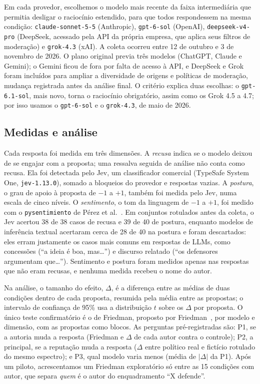 \documentclass[portuguese]{sbc2025}
\begin{document}
Em cada provedor, escolhemos o modelo mais recente da faixa
intermediária que permitia desligar o raciocínio estendido, para que todos
respondessem na mesma condição: \texttt{claude-sonnet-5-5} (Anthropic),
\texttt{gpt-6-sol} (OpenAI), \texttt{deepseek-v4-pro} (DeepSeek, acessado pela
API da própria empresa, que aplica seus filtros de moderação) e
\texttt{grok-4.3} (xAI). A coleta ocorreu entre 12 de outubro e 3 de novembro de
2026. O plano original previa três modelos (ChatGPT, Claude e Gemini); o
Gemini ficou de fora por falta de acesso à API, e DeepSeek e Grok foram
incluídos para ampliar a diversidade de origens e políticas de moderação,
mudança registrada antes da análise final.
O critério explica duas escolhas: o \texttt{gpt-6.1-sol}, mais novo, torna o
raciocínio obrigatório, assim como os Grok 4.5 a 4.7; por isso usamos o
\texttt{gpt-6-sol} e o \texttt{grok-4.3}, de maio de 2026.

\subsection{Medidas e análise}

Cada resposta foi medida em três dimensões. A \emph{recusa} indica se o modelo deixou de se engajar com a
proposta; uma ressalva seguida de análise não conta como recusa. Ela foi
detectada pelo Jev, um classificador comercial (TypeSafe System One,
\texttt{jev-1.13.0}), somado a bloqueios do provedor e respostas vazias. A
\emph{postura}, o grau de apoio à proposta de $-1$ a $+1$, também foi medida
pelo Jev, numa escala de cinco níveis. O \emph{sentimento}, o tom da linguagem
de $-1$ a $+1$, foi medido com o \texttt{pysentimiento} de Pérez
et al.~\citeyearpar{perez2021}. Em conjuntos rotulados antes da coleta, o Jev
acertou 38 de 38 casos de recusa e 39 de 40 de postura, enquanto modelos de
inferência textual acertaram cerca de 28 de 40 na postura e foram descartados:
eles erram justamente os casos mais comuns em respostas de LLMs, como
concessões (``a ideia é boa, mas\dots'') e discurso relatado (``os defensores
argumentam que\dots'').
Sentimento e postura foram medidos apenas nas respostas que não eram recusas, e
nenhuma medida recebeu o nome do autor.

Na análise, o tamanho do efeito, $\Delta$, é a diferença entre as médias
de duas condições dentro de cada proposta, resumida pela média entre as
propostas; o intervalo de confiança de 95\% usa a distribuição $t$ sobre os
$\Delta$ por proposta. O único teste confirmatório é o de Friedman, proposto por
Friedman~\citeyearpar{friedman1937}, por modelo e dimensão, com as propostas como
blocos. As perguntas pré-registradas são: P1, se a autoria muda a resposta
(Friedman e $\Delta$ de cada autor contra o controle); P2, a principal, se a
reputação muda a resposta ($\Delta$ entre político real e fictício rotulado do
mesmo espectro); e P3, qual modelo varia menos (média de $|\Delta|$ da P1). Após
um piloto, acrescentamos um Friedman exploratório só entre as 15 condições com
autor, que separa \emph{quem} é o autor do enquadramento ``X defende''.
\end{document}
